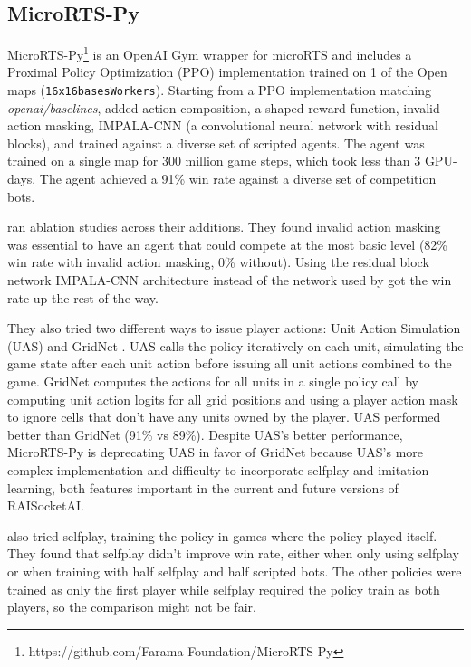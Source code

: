 \documentclass{article}
\begin{document}
\subsection{MicroRTS-Py}
MicroRTS-Py\footnote{https://github.com/Farama-Foundation/MicroRTS-Py} is an OpenAI Gym
wrapper for microRTS and includes a Proximal Policy Optimization (PPO) implementation
trained on 1 of the Open maps (\texttt{16x16basesWorkers}). Starting from a PPO
implementation matching \textit{openai/baselines},
\citet{DBLP:journals/corr/abs-2105-13807} added action composition, a shaped reward function, invalid action
masking, IMPALA-CNN (a convolutional neural network with residual blocks), and trained
against a diverse set of scripted agents. The agent was trained on a single map for 300
million game steps, which took less than 3 GPU-days. The agent achieved a
91\% win rate against a diverse set of competition bots.

\citet{DBLP:journals/corr/abs-2105-13807} ran ablation studies across their additions.
They found invalid action masking was essential to have an agent that could compete at
the most basic level (82\% win rate with invalid action masking, 0\% without). Using the
residual block network IMPALA-CNN architecture instead of the network used by
\citet{DBLP:journals/corr/MnihKSGAWR13} got the win rate up the rest of the way.

They also tried two different ways to issue player actions: Unit Action Simulation (UAS)
and GridNet \citep{pmlr-v97-han19a}. UAS calls the policy iteratively on each unit, simulating the game state
after each unit action before issuing all unit actions combined to the game. GridNet
computes the actions for all units in a single policy call by computing unit action
logits for all grid positions and using a player action mask to ignore cells that don't
have any units owned by the player. UAS performed better than GridNet (91\% vs 89\%).
Despite UAS's better performance, MicroRTS-Py is deprecating UAS in favor of GridNet
because UAS's more complex implementation and difficulty to incorporate selfplay and
imitation learning, both features important in the current and future versions of
RAISocketAI.

\citet{DBLP:journals/corr/abs-2105-13807} also tried selfplay, training the policy in
games where the policy played itself. They found that selfplay didn't improve win rate,
either when only using selfplay or when training with half selfplay and half scripted
bots. The other policies were trained as only the first player while selfplay required
the policy train as both players, so the comparison might not be fair.
\end{document}
